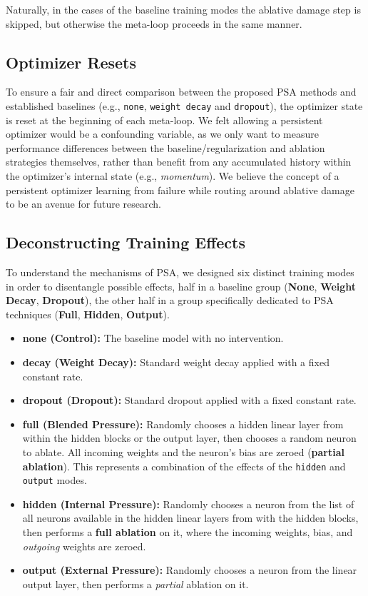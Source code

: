 \documentclass[conference]{IEEEtran}
\begin{document}
Naturally, in the cases of the baseline training modes the ablative damage step is skipped, but otherwise the meta-loop proceeds in the same manner.

\subsection{Optimizer Resets}
To ensure a fair and direct comparison between the proposed PSA methods and established baselines (e.g., \verb|none|, \verb|weight decay| and \verb|dropout|), the optimizer state is reset at the beginning of each meta-loop. We felt allowing a persistent optimizer would be a confounding variable, as we only want to measure performance differences between the baseline/regularization and ablation strategies themselves, rather than benefit from any accumulated history within the optimizer's internal state (e.g., \textit{momentum}). We believe the concept of a persistent optimizer learning from failure while routing around ablative damage to be an avenue for future research.

\subsection{Deconstructing Training Effects}
To understand the mechanisms of PSA, we designed six distinct training modes in order to disentangle possible effects, half in a baseline group (\textbf{None}, \textbf{Weight Decay}, \textbf{Dropout}), the other half in a group specifically dedicated to PSA techniques (\textbf{Full}, \textbf{Hidden}, \textbf{Output}). 

\begin{itemize}
    \item \textbf{none (Control):} The baseline model with no intervention.\\
    \item \textbf{decay (Weight Decay):} Standard weight decay applied with a fixed constant rate.\\
    \item \textbf{dropout (Dropout): } Standard dropout applied with a fixed constant rate.\\
    \item \textbf{full (Blended Pressure):} Randomly chooses a hidden linear layer from within the hidden blocks or the output layer, then chooses a random neuron to ablate. All incoming weights and the neuron's bias are zeroed (\textbf{partial ablation}). This represents a combination of the effects of the \verb|hidden| and \verb|output| modes.\\
    \item \textbf{hidden (Internal Pressure):} Randomly chooses a neuron from the list of all neurons available in the hidden linear layers from with the hidden blocks, then performs a \textbf{full ablation} on it, where the incoming weights, bias, and \textit{outgoing} weights are zeroed.\\
    \item \textbf{output (External Pressure):} Randomly chooses a neuron from the linear output layer, then performs a \textit{partial} ablation on it.\\
\end{itemize}
\end{document}

